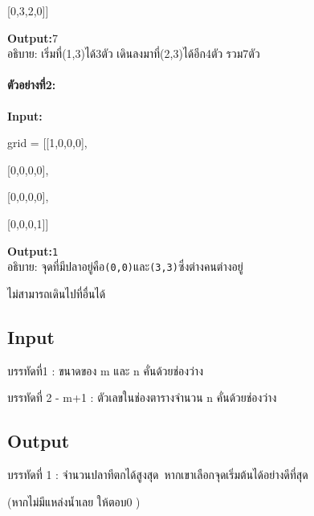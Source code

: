 \documentclass{article}
\begin{document}
{[}0,3,2,0{]}{]}



\textbf{Output:}7\\

อธิบาย: เริ่มที่(1,3)ได้3ตัว เดินลงมาที่(2,3)ได้อีก4ตัว รวม7ตัว



\hfill\break



\paragraph{\texorpdfstring{\textbf{ตัวอย่างที่2:}}{ตัวอย่างที่2:}}\label{uxe15uxe27uxe2duxe22uxe32uxe07uxe172}



\textbf{Input:}



grid = {[}{[}1,0,0,0{]},



{[}0,0,0,0{]},



{[}0,0,0,0{]},



{[}0,0,0,1{]}{]}



\textbf{Output:}\texttt{1}\\

อธิบาย: จุดที่มีปลาอยู่คือ\texttt{(0,0)}และ\texttt{(3,3)}ซึ่งต่างคนต่างอยู่

ไม่สามารถเดินไปที่อื่นได้



\subsection*{Input}
บรรทัดที่1 : ขนาดของ m และ n คั่นด้วยช่องว่าง



บรรทัดที่ 2 - m+1 : ตัวเลขในช่องตารางจำนวน n คั่นด้วยช่องว่าง



\subsection*{Output}
บรรทัดที่ 1 : จำนวนปลาทีตกได้สูงสุด~หากเขาเลือกจุดเริ่มต้นได้อย่างดีที่สุด

(หากไม่มีแหล่งน้ำเลย ให้ตอบ0 )
\end{document}
